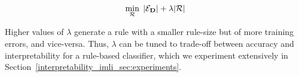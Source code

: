  \begin{equation}
  \label{interpretability_imli_eq:obj}
 \min\limits_{\mathcal{R}} \;  |\mathcal{E}_{\mathbf{D}}| +\lambda |\mathcal{R}|
 \end{equation}
 
Higher  values of $ \lambda $ generate a rule with a smaller rule-size but of more training errors, and vice-versa. Thus, $ \lambda $ can be tuned to trade-off between accuracy and interpretability for a rule-based classifier, which we experiment extensively in Section~\ref{interpretability_imli_sec:experiments}.

